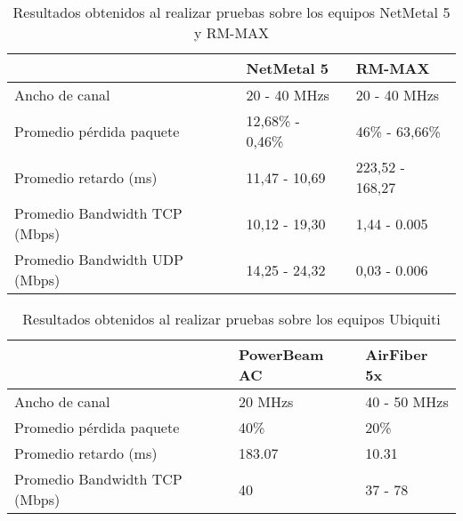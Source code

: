 \begin{table}[H]
	\begin{center}
		\begin{tabular}{|l|l|l|}
			\hline
			 & NetMetal 5 & RM-MAX\\
			\hline
            Ancho de canal & 20 - 40 MHzs & 20 - 40 MHzs\\
			\hline 
		Promedio pérdida paquete  & 12,68\% - 0,46\% & 46\% - 63,66\% \\ \hline
		Promedio retardo (ms) & 11,47 - 10,69 & 223,52 - 168,27 \\ \hline
		Promedio Bandwidth TCP (Mbps) & 10,12 - 19,30  & 1,44 - 0.005  \\ \hline
		Promedio Bandwidth UDP (Mbps) & 14,25 - 24,32  & 0,03 - 0.006  \\ \hline
		\end{tabular}
	\end{center}
	\caption{Resultados obtenidos al realizar pruebas sobre los equipos NetMetal 5 y RM-MAX}
	\label{table:pruebasEquipos}
\end{table}

\begin{table}[H]
	\begin{center}
		\begin{tabular}{|l|l|l|}
			\hline
			 & PowerBeam AC  & AirFiber 5x\\
			\hline
            Ancho de canal & 20 MHzs & 40 - 50 MHzs\\
			\hline 
		Promedio pérdida paquete  & 40\% & 20\% \\ \hline
		Promedio retardo (ms) & 183.07  & 10.31 \\ \hline
		Promedio Bandwidth TCP (Mbps) & 40  & 37 - 78 \\  \hline
		\end{tabular}
	\end{center}
	\caption{Resultados obtenidos al realizar pruebas sobre los equipos Ubiquiti}
	\label{table:pruebasEquiposUbiquiti}
\end{table}

